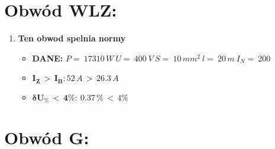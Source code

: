 
\section{Obwód WLZ:}

\begin{enumerate}
\item \textcolor{Green}{\cmark} \textbf{Ten obwod spelnia normy} 
\begin{itemize}
\item[] \textbf{DANE: } \: $ P = \:17310\, W\: U = \:400\: V\: S = \:10\, mm^2\: l = \:20\, m\: I_N= \: $200
\item[\textcolor{Green}{\cmark}] $ \pmb{I_Z \, >  \, I_B: }52 \, A \, > \,26.3 \, A $
\item[\textcolor{Green}{\cmark}] $ \pmb{ \delta U_\% \, < \, 4\%:} \:0.37 \, \% \,< \, 4\% $
\end{itemize}
\end{enumerate}
\section{Obwód G:}

